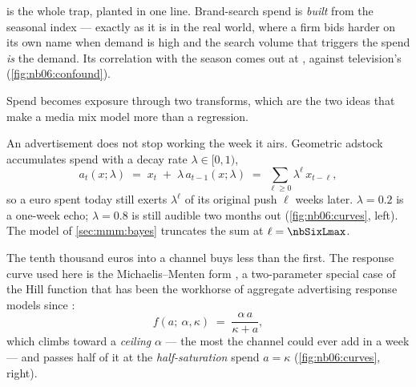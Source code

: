  is the whole trap, planted in one line. Brand-search spend is \emph{built} from
the seasonal index --- exactly as it is in the real world, where a firm bids harder on its own name
when demand is high and the search volume that triggers the spend \emph{is} the demand. Its
correlation with the season comes out at \nbSixCorrBsSeason{}, against television's
\nbSixCorrTvSeason{} (\cref{fig:nb06:confound}).

Spend becomes exposure through two transforms, which are the two ideas that make a media mix model
more than a regression.

\begin{description}[leftmargin=*, style=nextline]
  \item[Adstock, or carry-over.] An advertisement does not stop working the week it airs. Geometric
        adstock accumulates spend with a decay rate $\lambda \in [0, 1)$,
        \begin{equation}
          a_t(x;\lambda) \;=\; x_t \;+\; \lambda\, a_{t-1}(x;\lambda)
          \;=\; \sum_{\ell \ge 0} \lambda^{\ell}\, x_{t-\ell},
          \label{eq:mmm:adstock}
        \end{equation}
        so a euro spent today still exerts $\lambda^{\ell}$ of its original push $\ell$ weeks
        later. $\lambda = 0.2$ is a one-week echo; $\lambda = 0.8$ is still audible two months out
        (\cref{fig:nb06:curves}, left). The model of \cref{sec:mmm:bayes} truncates the sum at
        $\ell = \nbSixLmax$.

  \item[Saturation, or diminishing returns.] The tenth thousand euros into a channel buys less than
        the first. The response curve used here is the Michaelis--Menten form
        \citep{michaelis1913}, a two-parameter special case of the Hill function \citep{hill1910}
        that has been the workhorse of aggregate advertising response models since
        \citet{little1979}:
        \begin{equation}
          f(a;\ \alpha, \kappa) \;=\; \frac{\alpha\, a}{\kappa + a},
          \label{eq:mmm:mm}
        \end{equation}
        which climbs toward a \emph{ceiling} $\alpha$ --- the most the channel could ever add in a
        week --- and passes half of it at the \emph{half-saturation} spend $a = \kappa$
        (\cref{fig:nb06:curves}, right).
\end{description}

